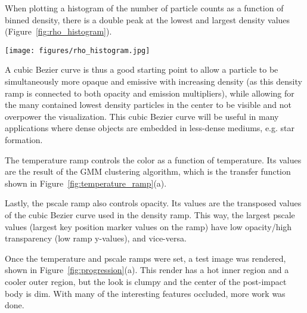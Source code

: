 \documentclass[fleqn,usenatbib,useAMS]{mnras}
\begin{document}
When plotting a histogram of the number of particle counts as a function of binned density, there is a double peak at the lowest and largest density values (Figure~\ref{fig:rho_histogram}).
%
\begin{figure*}
\centering
\texttt{[image: figures/rho\_histogram.jpg]}
\caption{A histogram of the number of particle counts as a function of binned (pre-processed) density. Most particles are either in the highest density regimes (center of post-impact body) or the lowest density regimes (out in the outer fringes). For our purposes, the higher density regions of the simulation are most interesting to visualize, in part to better compare this work's renders to those from the AVL.}
\label{fig:rho_histogram}
\end{figure*}
%
A cubic Bezier curve is thus a good starting point to allow a particle to be simultaneously more opaque and emissive with increasing density (as this density ramp is connected to both opacity and emission multipliers), while allowing for the many contained lowest density particles in the center to be visible and not overpower the visualization. This cubic Bezier curve will be useful in many applications where dense objects are embedded in less-dense mediums, e.g. star formation. \par

The temperature ramp controls the color as a function of temperature. Its values are the result of the GMM clustering algorithm, which is the transfer function shown in Figure~\ref{fig:temperature_ramp}(a). \par

Lastly, the pscale ramp also controls opacity. Its values are the transposed values of the cubic Bezier curve used in the density ramp. This way, the largest pscale values (largest key position marker values on the ramp) have low opacity/high transparency (low ramp y-values), and vice-versa. \par

Once the temperature and pscale ramps were set, a test image was rendered, shown in Figure~\ref{fig:progression}(a). This render has a hot inner region and a cooler outer region, but the look is clumpy and the center of the post-impact body is dim. With many of the interesting features occluded, more work was done.
%
%
\end{document}
